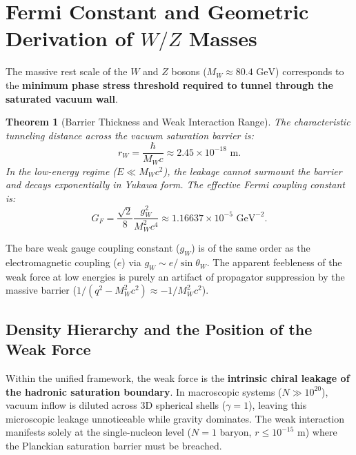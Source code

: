 \documentclass[11pt,a4paper]{article}
\newtheorem{theorem}{Theorem}[section]
\begin{document}
\section{Fermi Constant and Geometric Derivation of $W/Z$ Masses}
\label{sec:fermi_turetilis}

The massive rest scale of the $W$ and $Z$ bosons ($M_W \approx 80.4\text{ GeV}$) corresponds to the \textbf{minimum phase stress threshold required to tunnel through the saturated vacuum wall}.

\begin{theorem}[Barrier Thickness and Weak Interaction Range]
    \label{thm:bariyer_ve_menzil_p4}
    The characteristic tunneling distance across the vacuum saturation barrier is:
    \begin{equation}
        r_W = \frac{\hbar}{M_W c} \approx 2.45 \times 10^{-18}\text{ m}.
        \label{eq:rw_tr}
    \end{equation}
    In the low-energy regime ($E \ll M_W c^2$), the leakage cannot surmount the barrier and decays exponentially in Yukawa form. The effective Fermi coupling constant is:
    \begin{equation}
        G_F = \frac{\sqrt{2}}{8} \frac{g_W^2}{M_W^2 c^4} \approx 1.16637 \times 10^{-5}\text{ GeV}^{-2}.
        \label{eq:fermi_ispat_tr}
    \end{equation}
\end{theorem}

The bare weak gauge coupling constant ($g_W$) is of the same order as the electromagnetic coupling ($e$) via $g_W \sim e / \sin\theta_W$. The apparent feebleness of the weak force at low energies is purely an artifact of propagator suppression by the massive barrier ($1/(q^2 - M_W^2 c^2) \approx -1/M_W^2 c^2$).

\subsection{Density Hierarchy and the Position of the Weak Force}
\label{sec:zayif_yogunluk_konumu}

Within the unified framework, the weak force is the \textbf{intrinsic chiral leakage of the hadronic saturation boundary}. In macroscopic systems ($N \gg 10^{20}$), vacuum inflow is diluted across 3D spherical shells ($\gamma = 1$), leaving this microscopic leakage unnoticeable while gravity dominates. The weak interaction manifests solely at the single-nucleon level ($N = 1$ baryon, $r \le 10^{-15}\text{ m}$) where the Planckian saturation barrier must be breached.
\end{document}
